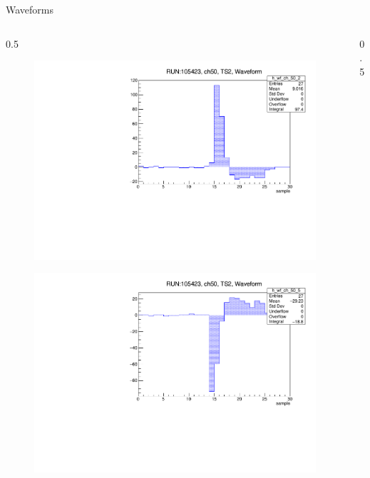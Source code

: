 \documentclass{beamer}[10pt]
\begin{document}
\begin{frame}{Waveforms}
\vspace{-4mm}
\begin{columns}
\begin{column}{0.5\framewidth}
\begin{figure}[H]
   \centering
   \includegraphics[width= 1.0\columnwidth]{figures/pdf/waveform_50_link_2.pdf}
   \label{fig:wfgkghl}
 \end{figure}
\vspace{-9mm}
\begin{figure}[H]
   \centering
   \includegraphics[width= 1.0\columnwidth]{figures/pdf/waveform_50_link_2_neg.pdf}
   \label{fig:wfgkgnvjkhl}
 \end{figure}
\end{column}
\begin{column}{0.5\framewidth}

\end{column}
\end{columns}
\end{frame}
\end{document}
